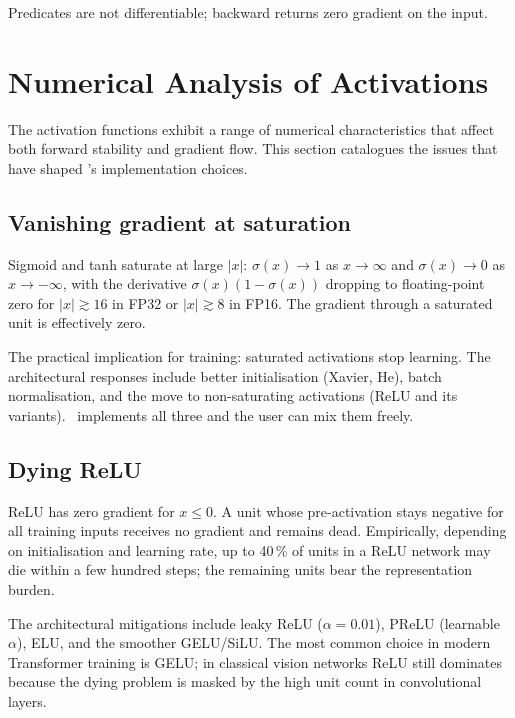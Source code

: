 Predicates are not differentiable; backward returns zero gradient
on the input.

\section{Numerical Analysis of Activations}
\label{sec:unary_functions:numerical_analysis}

The activation functions exhibit a range of numerical
characteristics that affect both forward stability and gradient
flow. This section catalogues the issues that have shaped \Lucid's
implementation choices.

\subsection{Vanishing gradient at saturation}
\label{ssec:unary_functions:vanishing_grad}

Sigmoid and tanh saturate at large $|x|$: $\sigma(x) \to 1$ as
$x \to \infty$ and $\sigma(x) \to 0$ as $x \to -\infty$, with the
derivative $\sigma(x)(1 - \sigma(x))$ dropping to floating-point
zero for $|x| \gtrsim 16$ in FP32 or $|x| \gtrsim 8$ in FP16. The
gradient through a saturated unit is effectively zero.

The practical implication for training: saturated activations stop
learning. The architectural responses include better
initialisation (Xavier, He), batch normalisation, and the move to
non-saturating activations (ReLU and its variants). \Lucid\
implements all three and the user can mix them freely.

\subsection{Dying ReLU}
\label{ssec:unary_functions:dying_relu}

ReLU has zero gradient for $x \leq 0$. A unit whose pre-activation
stays negative for all training inputs receives no gradient and
remains dead. Empirically, depending on initialisation and
learning rate, up to 40\,\% of units in a ReLU network may die
within a few hundred steps; the remaining units bear the
representation burden.

The architectural mitigations include leaky ReLU
($\alpha = 0.01$), PReLU (learnable $\alpha$), ELU, and the
smoother GELU/SiLU. The most common choice in modern Transformer
training is GELU; in classical vision networks ReLU still
dominates because the dying problem is masked by the high unit
count in convolutional layers.

